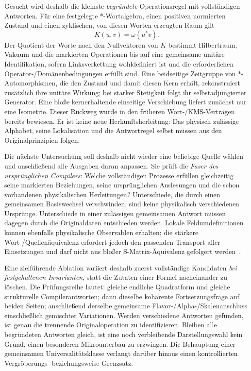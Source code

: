 Gesucht wird deshalb die kleinste \emph{begründete} Operationsregel mit vollständigen Antworten. Für eine festgelegte $*$-Wortalgebra, einen positiven normierten Zustand und einen zyklischen, von diesen Worten erzeugten Raum gilt
\[
 K(u,v)=\omega(u^*v).
\]
Der Quotient der Worte nach den Nullvektoren von $K$ bestimmt Hilbertraum, Vakuum und die markierten Operationen bis auf eine gemeinsame unitäre Identifikation, sofern Linksverkettung wohldefiniert ist und die erforderlichen Operator-/Domänenbedingungen erfüllt sind. Eine beidseitige Zeitgruppe von $*$-Automorphismen, die den Zustand und damit diesen Kern erhält, rekonstruiert zusätzlich ihre unitäre Wirkung; bei starker Stetigkeit folgt ihr selbstadjungierter Generator. Eine bloße kernerhaltende einseitige Verschiebung liefert zunächst nur eine Isometrie. Dieser Rückweg wurde in den früheren Wort-/KMS-Verträgen bereits bewiesen. Er ist keine neue Herkunftsherleitung: Das physisch zulässige Alphabet, seine Lokalisation und die Antwortregel selbst müssen aus den Originalprinzipien folgen.

Die nächste Untersuchung soll deshalb nicht wieder eine beliebige Quelle wählen und anschließend alle Ausgaben daran anpassen. Sie prüft die \emph{Faser des ursprünglichen Compilers}: Welche vollständigen Prozesse erfüllen gleichzeitig seine markierten Beziehungen, seine ursprünglichen Auslesungen und die schon vorhandenen physikalischen Herleitungen? Unterschiede, die durch einen gemeinsamen Basiswechsel verschwinden, sind keine physikalisch verschiedenen Ursprünge. Unterschiede in einer zulässigen gemeinsamen Antwort müssen dagegen durch die Originaldaten entschieden werden. Lokale Feldumdefinitionen können ebenfalls physikalische Observablen erhalten; die stärkere Wort-/Quellenäquivalenz erfordert jedoch den passenden Transport aller Einsetzungen und darf nicht aus bloßer S-Matrix-Äquivalenz gefolgert werden~\cite{criadoredefinitions}.

Eine zielführende Ablation variiert deshalb zuerst vollständige Kandidaten \emph{bei festgehaltenen Invarianten}, statt die Zutaten einer Formel nacheinander zu löschen. Die Prüfungsreihe lautet: gleiche endliche Quadratform und gleiche strukturelle Compilerantworten; dann dieselbe kohärente Fortsetzungsfrage auf beiden Seiten; anschließend derselbe gemeinsame Flavor-/Alpha-/Skalenanschluss einschließlich gemischter Variationen. Werden verschiedene Antworten gefunden, ist genau die trennende Originaloperation zu identifizieren. Bleiben alle begründeten Antworten gleich, ist eine noch verbleibende Darstellungswahl kein Grund, einen besonderen Mikrounterbau zu erzwingen. Die Behauptung einer gemeinsamen Universalitätsklasse verlangt darüber hinaus einen kontrollierten Vergröberungs- beziehungsweise Grenzsatz.

